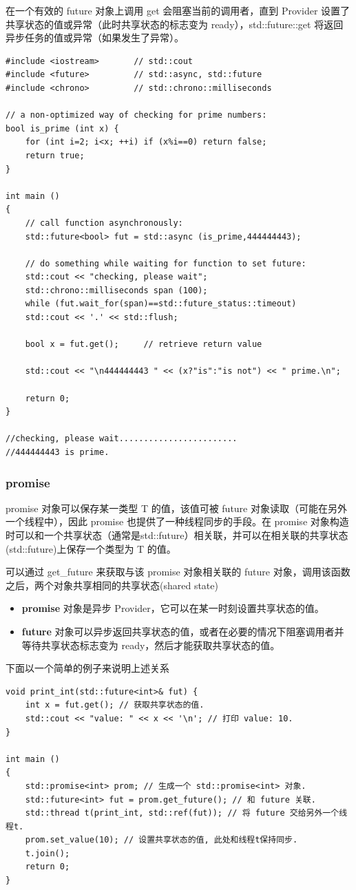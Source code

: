\documentclass[UTF8,a4paper,12pt]{ctexbook}
\begin{document}
			在一个有效的 future 对象上调用 get 会阻塞当前的调用者，直到 Provider 设置了共享状态的值或异常（此时共享状态的标志变为 ready），std::future::get 将返回异步任务的值或异常（如果发生了异常）。
\begin{lstlisting}
#include <iostream>       // std::cout
#include <future>         // std::async, std::future
#include <chrono>         // std::chrono::milliseconds

// a non-optimized way of checking for prime numbers:
bool is_prime (int x) {
	for (int i=2; i<x; ++i) if (x%i==0) return false;
	return true;
}

int main ()
{
	// call function asynchronously:
	std::future<bool> fut = std::async (is_prime,444444443); 
	
	// do something while waiting for function to set future:
	std::cout << "checking, please wait";
	std::chrono::milliseconds span (100);
	while (fut.wait_for(span)==std::future_status::timeout)
	std::cout << '.' << std::flush;
	
	bool x = fut.get();     // retrieve return value
	
	std::cout << "\n444444443 " << (x?"is":"is not") << " prime.\n";
	
	return 0;
}

//checking, please wait........................
//444444443 is prime.
\end{lstlisting}
		\subsubsection{promise}
			promise 对象可以保存某一类型 T 的值，该值可被 future 对象读取（可能在另外一个线程中），因此 promise 也提供了一种线程同步的手段。在 promise 对象构造时可以和一个共享状态（通常是std::future）相关联，并可以在相关联的共享状态(std::future)上保存一个类型为 T 的值。
			
			可以通过 get\_future 来获取与该 promise 对象相关联的 future 对象，调用该函数之后，两个对象共享相同的共享状态(shared state)
				\begin{itemize}
					\item \textbf{promise} 对象是异步 Provider，它可以在某一时刻设置共享状态的值。
					\item \textbf{future} 对象可以异步返回共享状态的值，或者在必要的情况下阻塞调用者并等待共享状态标志变为 ready，然后才能获取共享状态的值。
				\end{itemize}
			
			下面以一个简单的例子来说明上述关系
				\begin{lstlisting}
void print_int(std::future<int>& fut) {
	int x = fut.get(); // 获取共享状态的值.
	std::cout << "value: " << x << '\n'; // 打印 value: 10.
}

int main ()
{
	std::promise<int> prom; // 生成一个 std::promise<int> 对象.
	std::future<int> fut = prom.get_future(); // 和 future 关联.
	std::thread t(print_int, std::ref(fut)); // 将 future 交给另外一个线程t.
	prom.set_value(10); // 设置共享状态的值, 此处和线程t保持同步.
	t.join();
	return 0;
}					
				\end{lstlisting}
			
\end{document}
